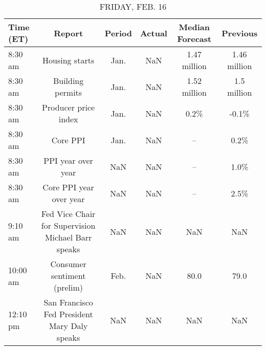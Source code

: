 \documentclass{article}%
\begin{document}
%


\begin{table}[htbp]%
\caption{FRIDAY, FEB. 16}%
\centering%
\begin{adjustbox}{width=1\textwidth}%
\begin{tabular}{lccccc}
\toprule
Time (ET) &                                             Report & Period & Actual & Median Forecast &     Previous \\
\midrule
  8:30 am &                                     Housing starts &   Jan. &    NaN &    1.47 million & 1.46 million \\
  8:30 am &                                   Building permits &   Jan. &    NaN &    1.52 million &  1.5 million \\
  8:30 am &                               Producer price index &   Jan. &    NaN &            0.2\% &        -0.1\% \\
  8:30 am &                                           Core PPI &   Jan. &    NaN &              -- &         0.2\% \\
  8:30 am &                                 PPI year over year &    NaN &    NaN &              -- &         1.0\% \\
  8:30 am &                            Core PPI year over year &    NaN &    NaN &              -- &         2.5\% \\
  9:10 am & Fed Vice Chair for Supervision Michael Barr speaks &    NaN &    NaN &             NaN &          NaN \\
 10:00 am &                        Consumer sentiment (prelim) &   Feb. &    NaN &            80.0 &         79.0 \\
 12:10 pm &       San Francisco Fed President Mary Daly speaks &    NaN &    NaN &             NaN &          NaN \\
\bottomrule
\end{tabular}
%
\end{adjustbox}%
\end{table}
\end{document}
